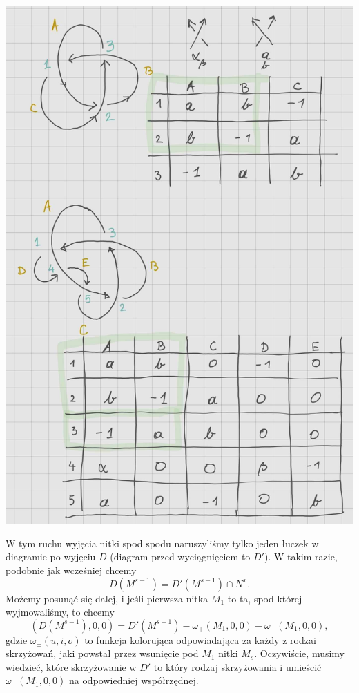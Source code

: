 \newpage 

\begin{center}
  \includegraphics[width=\textwidth]{./rozdzialy/relacja_trefl_2.jpg}
\end{center}
\newpage 

W tym ruchu wyjęcia nitki spod spodu naruszyliśmy tylko jeden łuczek w diagramie po wyjęciu $D$ (diagram przed wyciągnięciem to $D'$). W takim razie, podobnie jak wcześniej chcemy
$$D(M^{s-1})=D'(M^{s-1})\cap N^x.$$
Możemy posunąć się dalej, i jeśli pierwsza nitka $M_1$ to ta, spod której wyjmowaliśmy, to chcemy 
$$(D(M^{s-1}), 0, 0)=D'(M^{s-1})-\omega_+(M_1, 0, 0)-\omega_-(M_1, 0, 0),$$
gdzie $\omega_\pm(u, i, o)$ to funkcja kolorująca odpowiadająca za każdy z rodzai skrzyżowań, jaki powstał przez wsunięcie pod $M_1$ nitki $M_s$. Oczywiście, musimy wiedzieć, które skrzyżowanie w $D'$ to który rodzaj skrzyżowania i umieścić $\omega_\pm(M_1,0,0)$ na odpowiedniej współrzędnej. 

